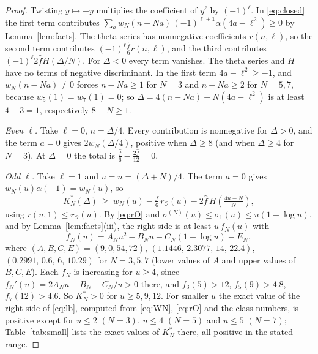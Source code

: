 \documentclass[11pt]{amsart}
\numberwithin{equation}{section}
\theoremstyle{plain}
\theoremstyle{remark}
\newcommand{\cO}{\mathcal{O}}
\begin{document}
\begin{proof}
Twisting $y\mapsto-y$ multiplies the coefficient of $y^\ell$ by $(-1)^\ell$. In \eqref{eq:closed} the first term contributes $\sum_aw_N(n-Na)\,(-1)^{\ell+1}\alpha(4a-\ell^2)\ge0$ by Lemma~\ref{lem:facts}. The theta series has nonnegative coefficients $r(n,\ell)$, so the second term contributes $(-1)^\ell\tfrac{\hat f}6r(n,\ell)$, and the third contributes $(-1)^\ell2\hat fH(\Delta/N)$. For $\Delta<0$ every term vanishes. The theta series and $H$ have no terms of negative discriminant. In the first term $4a-\ell^2\ge-1$, and $w_N(n-Na)\ne0$ forces $n-Na\ge1$ for $N=3$ and $n-Na\ge2$ for $N=5,7$, because $w_5(1)=w_7(1)=0$; so $\Delta=4(n-Na)+N(4a-\ell^2)$ is at least $4-3=1$, respectively $8-N\ge1$.

\emph{Even $\ell$.} Take $\ell=0$, $n=\Delta/4$. Every contribution is nonnegative for $\Delta>0$, and the term $a=0$ gives $2w_N(\Delta/4)$, positive when $\Delta\ge8$ (and when $\Delta\ge4$ for $N=3$). At $\Delta=0$ the total is $\tfrac{\hat f}{6}-\tfrac{2\hat f}{12}=0$.

\emph{Odd $\ell$.} Take $\ell=1$ and $u=n=(\Delta+N)/4$. The term $a=0$ gives $w_N(u)\alpha(-1)=w_N(u)$, so
\begin{equation}\label{eq:lb}
K^*_N(\Delta)\ \ge\ w_N(u)-\tfrac{\hat f}6\,r_{\cO}(u)-2\hat f\,H\!\left(\tfrac{4u-N}{N}\right),
\end{equation}
using $r(u,1)\le r_\cO(u)$. By \eqref{eq:rO} and $\sigma^{(N)}(u)\le\sigma_1(u)\le u(1+\log u)$, and by Lemma~\ref{lem:facts}(iii), the right side is at least $u\,f_N(u)$ with
\[
f_N(u)=A_Nu^2-B_Nu-C_N(1+\log u)-E_N,
\]
where $(A,B,C,E)=(9,0,54,72)$, $(1.1446,\,2.3077,\,14,\,22.4)$, $(0.2991,\,0.6,\,6,\,10.29)$ for $N=3,5,7$ (lower values of $A$ and upper values of $B,C,E$). Each $f_N$ is increasing for $u\ge4$, since $f_N'(u)=2A_Nu-B_N-C_N/u>0$ there, and $f_3(5)>12$, $f_5(9)>4.8$, $f_7(12)>4.6$. So $K^*_N>0$ for $u\ge5,9,12$. For smaller $u$ the exact value of the right side of \eqref{eq:lb}, computed from \eqref{eq:WN}, \eqref{eq:rO} and the class numbers, is positive except for $u\le2$ $(N=3)$, $u\le4$ $(N=5)$ and $u\le5$ $(N=7)$; Table~\ref{tab:small} lists the exact values of $K^*_N$ there, all positive in the stated range.
\end{proof}
\end{document}
